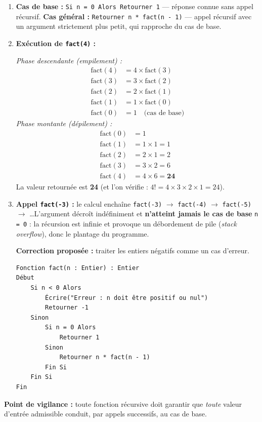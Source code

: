 \documentclass[11pt]{article}
\begin{document}
\begin{corrige}
\begin{enumerate}
\item \textbf{Cas de base :} \texttt{Si n = 0 Alors Retourner 1} — réponse connue sans appel récursif. \textbf{Cas général :} \texttt{Retourner n * fact(n - 1)} — appel récursif avec un argument strictement plus petit, qui rapproche du cas de base.
\item \textbf{Exécution de \texttt{fact(4)} :}

\emph{Phase descendante (empilement) :}
\begin{align*}
\text{fact}(4) &= 4 \times \text{fact}(3) \\
\text{fact}(3) &= 3 \times \text{fact}(2) \\
\text{fact}(2) &= 2 \times \text{fact}(1) \\
\text{fact}(1) &= 1 \times \text{fact}(0) \\
\text{fact}(0) &= 1 \quad \text{(cas de base)}
\end{align*}
\emph{Phase montante (dépilement) :}
\begin{align*}
\text{fact}(0) &= 1 \\
\text{fact}(1) &= 1 \times 1 = 1 \\
\text{fact}(2) &= 2 \times 1 = 2 \\
\text{fact}(3) &= 3 \times 2 = 6 \\
\text{fact}(4) &= 4 \times 6 = \mathbf{24}
\end{align*}
La valeur retournée est \textbf{24} (et l'on vérifie : $4! = 4\times3\times2\times1 = 24$).
\item \textbf{Appel \texttt{fact(-3)} :} le calcul enchaîne \texttt{fact(-3)} $\to$ \texttt{fact(-4)} $\to$ \texttt{fact(-5)} $\to$ \ldots L'argument décroît indéfiniment et \textbf{n'atteint jamais le cas de base} \texttt{n = 0} : la récursion est infinie et provoque un débordement de pile (\emph{stack overflow}), donc le plantage du programme.

\textbf{Correction proposée :} traiter les entiers négatifs comme un cas d'erreur.
\begin{lstlisting}
Fonction fact(n : Entier) : Entier
Début
    Si n < 0 Alors
        Écrire("Erreur : n doit être positif ou nul")
        Retourner -1
    Sinon
        Si n = 0 Alors
            Retourner 1
        Sinon
            Retourner n * fact(n - 1)
        Fin Si
    Fin Si
Fin
\end{lstlisting}
\end{enumerate}
\textbf{Point de vigilance :} toute fonction récursive doit garantir que \emph{toute} valeur d'entrée admissible conduit, par appels successifs, au cas de base.
\end{corrige}
\end{document}
